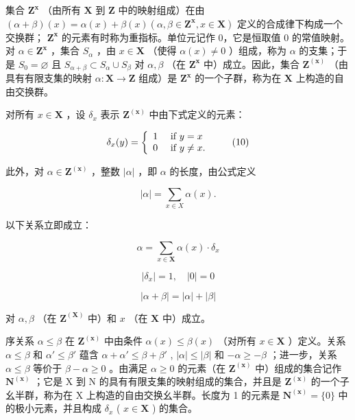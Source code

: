 集合 \(\mathbf{Z}^{\mathbf{x}}\) （由所有 \(\mathbf{X}\) 到 \(\mathbf{Z}\) 中的映射组成）在由 \((\alpha + \beta)(x) = \alpha(x) + \beta(x)(\alpha, \beta \in \mathbf{Z}^{\mathbf{x}}, x \in \mathbf{X})\) 定义的合成律下构成一个交换群； \(\mathbf{Z}^{\mathbf{x}}\) 的元素有时称为重指标。单位元记作 0，它是恒取值 0 的常值映射。对 \(\alpha \in \mathbf{Z}^{\mathbf{x}}\) ，集合 \(S_{\alpha}\) ，由 \(x \in \mathbf{X}\) （使得 \(\alpha(x) \neq 0\) ）组成，称为 \(\alpha\) 的支集；于是 \(S_0 = \varnothing\) 且 \(S_{\alpha + \beta} \subset S_{\alpha} \cup S_{\beta}\) 对 \(\alpha, \beta\) （在 \(\mathbf{Z}^{\mathbf{x}}\) 中）成立。因此，集合 \(\mathbf{Z}^{(\mathbf{x})}\) （由具有有限支集的映射 \(\alpha: \mathbf{X} \to \mathbf{Z}\) 组成）是 \(\mathbf{Z}^{\mathbf{x}}\) 的一个子群，称为在 \(\mathbf{X}\) 上构造的自由交换群。

对所有 \(x \in \mathbf{X}\) ，设 \(\delta_x\) 表示 \(\mathbf{Z}^{(\mathbf{x})}\) 中由下式定义的元素：

\[
\delta_ {x} (y) = \left\{ \begin{array}{l l} 1 & \text { if } y = x \\ 0 & \text { if } y \neq x. \end{array} \right.\tag{10}
\]

此外，对 \(\alpha \in \mathbf{Z}^{(\mathbf{x})}\) ，整数 \(|\alpha|\) ，即 \(\alpha\) 的长度，由公式定义

\[
| \alpha | = \sum_ {x \in X} \alpha (x).\tag{11}
\]

以下关系立即成立：

\[
\alpha = \sum_ {x \in \mathbf {X}} \alpha (x) \cdot \delta_ {x}\tag{12}
\]

\[
\left| \delta_ {x} \right| = 1, \quad \left| 0 \right| = 0\tag{13}
\]

\[
| \alpha + \beta | = | \alpha | + | \beta |\tag{14}
\]

对 \(\alpha, \beta\) （在 \(\mathbf{Z}^{(\mathbf{X})}\) 中）和 \(x\) （在 \(\mathbf{X}\) 中）成立。

序关系 \(\alpha \leqslant \beta\) 在 \(\mathbf{Z}^{(\mathbf{x})}\) 中由条件 \(\alpha(x) \leqslant \beta(x)\) （对所有 \(x \in \mathbf{X}\) ）定义。关系 \(\alpha \leqslant \beta\) 和 \(\alpha' \leqslant \beta'\) 蕴含 \(\alpha + \alpha' \leqslant \beta + \beta'\) , \(|\alpha| \leqslant |\beta|\) 和 \(-\alpha \geqslant -\beta\) ；进一步，关系 \(\alpha \leqslant \beta\) 等价于 \(\beta - \alpha \geqslant 0\) 。由满足 \(\alpha \geqslant 0\) 的元素（在 \(\mathbf{Z}^{(\mathbf{x})}\) 中）组成的集合记作 \(\mathbf{N}^{(\mathbf{x})}\) ；它是 X 到 N 的具有有限支集的映射组成的集合，并且是 \(\mathbf{Z}^{(\mathbf{x})}\) 的一个子幺半群，称为在 X 上构造的自由交换幺半群。长度为 1 的元素是 \(\mathbf{N}^{(\mathbf{x})} = \{0\}\) 中的极小元素，并且构成 \(\delta_x\) ( \(x \in \mathbf{X}\) ) 的集合。

